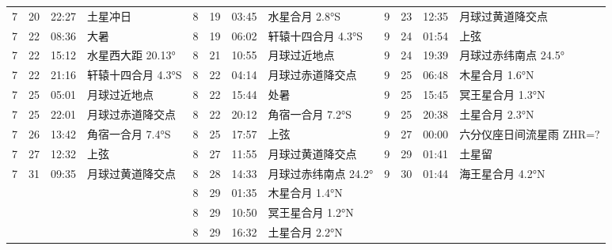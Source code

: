 \begin{tabular}{llll|llll|llll}
7 & 20 & 22:27 & 土星冲日 & 8 & 19 & 03:45 & 水星合月 2.8°S & 9 & 23 & 12:35 & 月球过黄道降交点 \tabularnewline
7 & 22 & 08:36 & 大暑 & 8 & 19 & 06:02 & 轩辕十四合月 4.3°S & 9 & 24 & 01:54 & 上弦 \tabularnewline
7 & 22 & 15:12 & 水星西大距 20.13° & 8 & 21 & 10:55 & 月球过近地点 & 9 & 24 & 19:39 & 月球过赤纬南点 24.5° \tabularnewline
7 & 22 & 21:16 & 轩辕十四合月 4.3°S & 8 & 22 & 04:14 & 月球过赤道降交点 & 9 & 25 & 06:48 & 木星合月 1.6°N \tabularnewline
7 & 25 & 05:01 & 月球过近地点 & 8 & 22 & 15:44 & 处暑 & 9 & 25 & 15:45 & 冥王星合月 1.3°N \tabularnewline
7 & 25 & 22:01 & 月球过赤道降交点 & 8 & 22 & 20:12 & 角宿一合月 7.2°S & 9 & 25 & 20:38 & 土星合月 2.3°N \tabularnewline
7 & 26 & 13:42 & 角宿一合月 7.4°S & 8 & 25 & 17:57 & 上弦 & 9 & 27 & 00:00 & 六分仪座日间流星雨 ZHR=? \tabularnewline
7 & 27 & 12:32 & 上弦 & 8 & 27 & 11:55 & 月球过黄道降交点 & 9 & 29 & 01:41 & 土星留 \tabularnewline
7 & 31 & 09:35 & 月球过黄道降交点 & 8 & 28 & 14:33 & 月球过赤纬南点 24.2° & 9 & 30 & 01:44 & 海王星合月 4.2°N \tabularnewline
 &  &  &  & 8 & 29 & 01:35 & 木星合月 1.4°N &  &  &  &  \tabularnewline
 &  &  &  & 8 & 29 & 10:50 & 冥王星合月 1.2°N &  &  &  &  \tabularnewline
 &  &  &  & 8 & 29 & 16:32 & 土星合月 2.2°N &  &  &  &  \tabularnewline
\hline \end{tabular}

